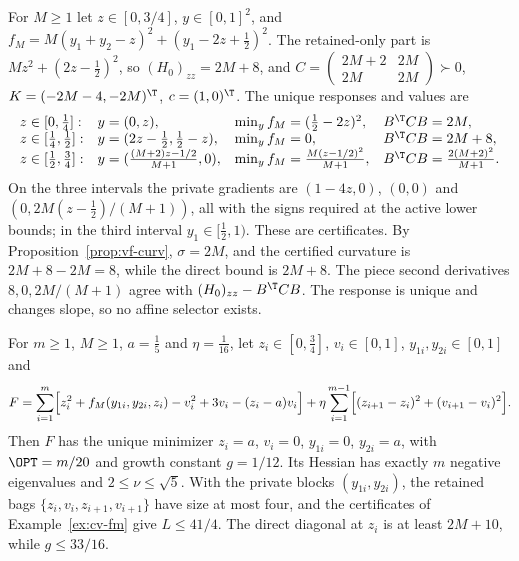 \begin{example}\label{ex:cv-fm}
For $M\ge1$ let $z\in[0,3/4]$, $y\in[0,1]^2$, and
$f_M=M(y_1+y_2-z)^2+(y_1-2z+\frac12)^2$. The retained-only part is
$Mz^2+(2z-\frac12)^2$, so $(H_0)_{zz}=2M+8$, and
$C=\left(\begin{smallmatrix}2M+2&2M\\2M&2M\end{smallmatrix}\right)\succ0$,
$K=(-2M-4,-2M)^{\T}$, $c=(1,0)^{\T}$. The unique responses and
values are
\[
\begin{array}{llll}
z\in[0,\tfrac14]:& y=(0,z),& \min_yf_M=(\tfrac12-2z)^2,& B^{\T}CB=2M,\\
z\in[\tfrac14,\tfrac12]:& y=(2z-\tfrac12,\tfrac12-z),& \min_yf_M=0,& B^{\T}CB=2M+8,\\
z\in[\tfrac12,\tfrac34]:& y=(\tfrac{(M+2)z-1/2}{M+1},0),& \min_yf_M=\tfrac{M(z-1/2)^2}{M+1},
& B^{\T}CB=\tfrac{2(M+2)^2}{M+1}.
\end{array}
\]
On the three intervals the private gradients are $(1-4z,0)$, $(0,0)$ and
$(0,2M(z-\frac12)/(M+1))$, all with the signs required at the active lower
bounds; in the third interval $y_1\in[\frac12,1)$. These are certificates. By
Proposition~\ref{prop:vf-curv}, $\sigma=2M$, and the certified curvature is
$2M+8-2M=8$, while the direct bound is $2M+8$. The piece second derivatives
$8,0,2M/(M+1)$ agree with $(H_0)_{zz}-B^{\T}CB$. The response is unique
and changes slope, so no affine selector exists.
\end{example}

\begin{proposition}\label{prop:cv-ladder}
For $m\ge1$, $M\ge1$, $a=\frac15$ and $\eta=\frac1{16}$, let
$z_i\in[0,\frac34]$, $v_i\in[0,1]$, $y_{1i},y_{2i}\in[0,1]$ and
\[
F=\sum_{i=1}^m\Bigl[z_i^2+f_M(y_{1i},y_{2i},z_i)-v_i^2+3v_i-(z_i-a)v_i\Bigr]
+\eta\sum_{i=1}^{m-1}\Bigl[(z_{i+1}-z_i)^2+(v_{i+1}-v_i)^2\Bigr].
\]
Then $F$ has the unique minimizer $z_i=a$, $v_i=0$, $y_{1i}=0$, $y_{2i}=a$, with
$\OPT=m/20$ and growth constant $g=1/12$. Its Hessian has exactly $m$
negative eigenvalues and $2\le\nu\le\sqrt5$. With the private blocks
$(y_{1i},y_{2i})$, the retained bags $\{z_i,v_i,z_{i+1},v_{i+1}\}$ have size at
most four, and the certificates of Example~\ref{ex:cv-fm} give $L\le41/4$. The
direct diagonal at $z_i$ is at least $2M+10$, while $g\le33/16$.
\end{proposition}

